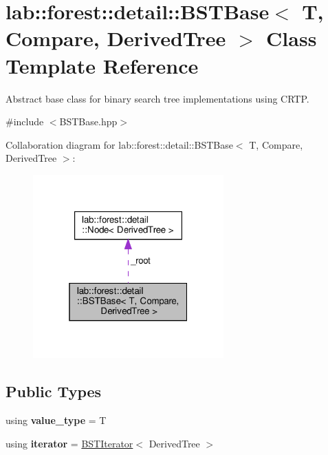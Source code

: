 \hypertarget{classlab_1_1forest_1_1detail_1_1BSTBase}{}\section{lab\+:\+:forest\+:\+:detail\+:\+:B\+S\+T\+Base$<$ T, Compare, Derived\+Tree $>$ Class Template Reference}
\label{classlab_1_1forest_1_1detail_1_1BSTBase}


Abstract base class for binary search tree implementations using C\+R\+TP.  




{\ttfamily \#include $<$B\+S\+T\+Base.\+hpp$>$}



Collaboration diagram for lab\+:\+:forest\+:\+:detail\+:\+:B\+S\+T\+Base$<$ T, Compare, Derived\+Tree $>$\+:
\nopagebreak
\begin{figure}[H]
\begin{center}
\leavevmode
\includegraphics[width=208pt]{classlab_1_1forest_1_1detail_1_1BSTBase__coll__graph}
\end{center}
\end{figure}
\subsection*{Public Types}
\begin{DoxyCompactItemize}
\item 
\mbox{\label{classlab_1_1forest_1_1detail_1_1BSTBase_ab100bb39d2607700286a707c40dcac11}} 
using {\bfseries value\+\_\+type} = T
\item 
\mbox{\label{classlab_1_1forest_1_1detail_1_1BSTBase_a6a6e409005b5922c1f9217d699cc965e}} 
using {\bfseries iterator} = \hyperlink{classlab_1_1forest_1_1detail_1_1BSTIterator}{B\+S\+T\+Iterator}$<$ Derived\+Tree $>$
\end{DoxyCompactItemize}
